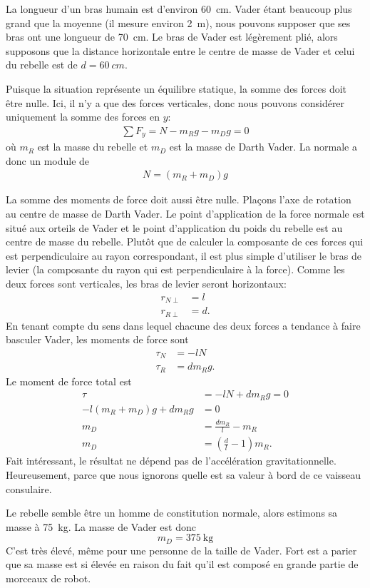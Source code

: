 \documentclass{tufte-handout}
\begin{document}
La longueur d'un bras humain est d'environ \SI{60}{\centi\meter}.  Vader étant
beaucoup plus grand que la moyenne (il mesure environ \SI{2}{\meter}), nous
pouvons supposer que ses bras ont une longueur de \SI{70}{\centi\meter}.  Le
bras de Vader est légèrement plié, alors supposons que la distance horizontale
entre le centre de masse de Vader et celui du rebelle est de $d = \SI{60}{cm}$.

Puisque la situation représente un équilibre statique, la somme des forces doit
être nulle.  Ici, il n'y a que des forces verticales, donc nous pouvons
considérer uniquement la somme des forces en $y$:
\begin{align*}
  \sum F_y = N - m_Rg - m_Dg = 0
\end{align*}
où $m_R$ est la masse du rebelle et $m_D$ est la masse de Darth Vader.  La
normale a donc un module de
\begin{align*}
  N = (m_R + m_D)g
\end{align*}

La somme des moments de force doit aussi être nulle.  Plaçons l'axe de rotation
au centre de masse de Darth Vader.  Le point d'application de la force normale
est situé aux orteils de Vader et le point d'application du poids du rebelle
est au centre de masse du rebelle.  Plutôt que de calculer la composante de ces
forces qui est perpendiculaire au rayon correspondant, il est plus simple
d'utiliser le bras de levier (la composante du rayon qui est perpendiculaire à
la force).  Comme les deux forces sont verticales, les bras de levier seront
horizontaux:
\begin{align*}
  r_{N\perp} &= l \\
  r_{R\perp} &= d.
\end{align*}
En tenant compte du sens dans lequel chacune des deux forces a tendance à faire
basculer Vader, les moments de force sont
\begin{align*}
  \tau_N &= -lN \\
  \tau_R &= dm_Rg.
\end{align*}
Le moment de force total est
\begin{align*}
  \tau &= -lN + dm_Rg = 0 \\
  -l(m_R + m_D)g + dm_Rg &= 0 \\
  m_D &= \frac{dm_R}{l} - m_R \\
  m_D &= \left(\frac{d}{l} - 1\right) m_R.
\end{align*}
Fait intéressant, le résultat ne dépend pas de l'accélération gravitationnelle.
Heureusement, parce que nous ignorons quelle est sa valeur à bord de ce
vaisseau consulaire.

Le rebelle semble être un homme de constitution normale, alors estimons sa
masse à \SI{75}{kg}.  La masse de Vader est donc
\[
  m_D = \SI{375}{\kilogram}
\]
C'est très élevé, même pour une personne de la taille de Vader.  Fort est a
parier que sa masse est si élevée en raison du fait qu'il est composé en grande
partie de morceaux de robot.
\end{document}
